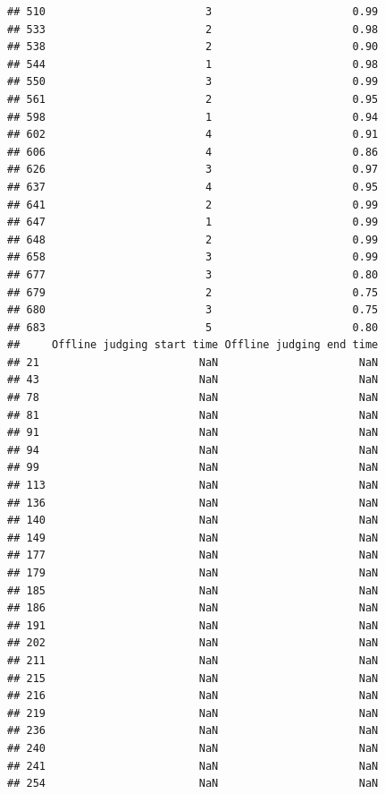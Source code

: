 \documentclass[
]{article}
\begin{document}
\begin{verbatim}
## 510                         3                      0.99
## 533                         2                      0.98
## 538                         2                      0.90
## 544                         1                      0.98
## 550                         3                      0.99
## 561                         2                      0.95
## 598                         1                      0.94
## 602                         4                      0.91
## 606                         4                      0.86
## 626                         3                      0.97
## 637                         4                      0.95
## 641                         2                      0.99
## 647                         1                      0.99
## 648                         2                      0.99
## 658                         3                      0.99
## 677                         3                      0.80
## 679                         2                      0.75
## 680                         3                      0.75
## 683                         5                      0.80
##     Offline judging start time Offline judging end time
## 21                         NaN                      NaN
## 43                         NaN                      NaN
## 78                         NaN                      NaN
## 81                         NaN                      NaN
## 91                         NaN                      NaN
## 94                         NaN                      NaN
## 99                         NaN                      NaN
## 113                        NaN                      NaN
## 136                        NaN                      NaN
## 140                        NaN                      NaN
## 149                        NaN                      NaN
## 177                        NaN                      NaN
## 179                        NaN                      NaN
## 185                        NaN                      NaN
## 186                        NaN                      NaN
## 191                        NaN                      NaN
## 202                        NaN                      NaN
## 211                        NaN                      NaN
## 215                        NaN                      NaN
## 216                        NaN                      NaN
## 219                        NaN                      NaN
## 236                        NaN                      NaN
## 240                        NaN                      NaN
## 241                        NaN                      NaN
## 254                        NaN                      NaN

\end{verbatim}
\end{document}
